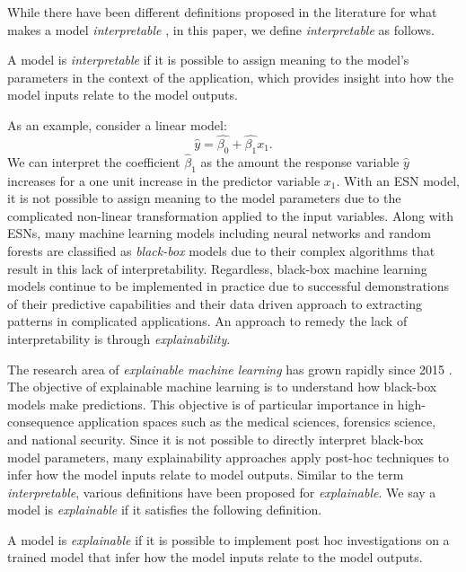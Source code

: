 \documentclass[AMS,STIX2COL]{WileyNJD-v2}
\begin{document}
While there have been different definitions proposed in the literature for what makes a model \emph{interpretable} \citep{doshi2017,lipton2018,rudin2019,murdoch2019}, in this paper, we define \emph{interpretable} as follows.
\begin{definition}[Interpretable]
A model is \emph{interpretable} if it is possible to assign meaning to the model's parameters in the context of the application, which provides insight into how the model inputs relate to the model outputs.
\end{definition}
As an example, consider a linear model: $$\hat{y}=\hat{\beta_0}+\hat{\beta_1}x_1.$$ We can interpret the coefficient $\hat{\beta}_1$ as the amount the response variable $\hat{y}$ increases for a one unit increase in the predictor variable $x_1$. With an ESN model, it is not possible to assign meaning to the model parameters due to the complicated non-linear transformation applied to the input variables. Along with ESNs, many machine learning models including neural networks and random forests are classified as \emph{black-box} models due to their complex algorithms that result in this lack of interpretability. Regardless, black-box machine learning models continue to be implemented in practice due to successful demonstrations of their predictive capabilities and their data driven approach to extracting patterns in complicated applications. An approach to remedy the lack of interpretability is through \emph{explainability}.

The research area of \emph{explainable machine learning} has grown rapidly since 2015 \citep{molnar2021}. The objective of explainable machine learning is to understand how black-box models make predictions. This objective is of particular importance in high-consequence application spaces such as the medical sciences, forensics science, and national security. Since it is not possible to directly interpret black-box model parameters, many explainability approaches apply post-hoc techniques to infer how the model inputs relate to model outputs. Similar to the term \emph{interpretable}, various definitions have been proposed for \emph{explainable}. We say a model is \emph{explainable} if it satisfies the following definition.
\begin{definition}[Explainable]
A model is \emph{explainable} if it is possible to implement post hoc investigations on a trained model that infer how the model inputs relate to the model outputs.
\end{definition}
\end{document}
